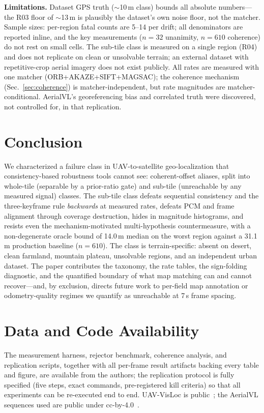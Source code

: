 \documentclass[journal]{IEEEtran}
\begin{document}
\textbf{Limitations.} Dataset GPS truth ($\sim$10\,m class) bounds all absolute numbers---the R03 floor of $\sim$13\,m is plausibly the dataset's own noise floor, not the matcher. Sample sizes: per-region fatal counts are 5--14 per drift; all denominators are reported inline, and the key measurements ($n=32$ unanimity, $n=610$ coherence) do not rest on small cells. The sub-tile class is measured on a single region (R04) and does not replicate on clean or unsolvable terrain; an external dataset with repetitive-crop aerial imagery does not exist publicly. All rates are measured with one matcher (ORB+AKAZE+SIFT+MAGSAC); the coherence mechanism (Sec.~\ref{sec:coherence}) is matcher-independent, but rate magnitudes are matcher-conditional. AerialVL's georeferencing bias and correlated truth were discovered, not controlled for, in that replication.

\section{Conclusion}

We characterized a failure class in UAV-to-satellite geo-localization that consistency-based robustness tools cannot see: coherent-offset aliases, split into whole-tile (separable by a prior-ratio gate) and sub-tile (unreachable by any measured signal) classes. The sub-tile class defeats sequential consistency and the three-keyframe rule \emph{backwards} at measured rates, defeats PCM and frame alignment through coverage destruction, hides in magnitude histograms, and resists even the mechanism-motivated multi-hypothesis countermeasure, with a non-degenerate oracle bound of 14.0\,m median on the worst region against a 31.1\,m production baseline ($n=610$). The class is terrain-specific: absent on desert, clean farmland, mountain plateau, unsolvable regions, and an independent urban dataset. The paper contributes the taxonomy, the rate tables, the sign-folding diagnostic, and the quantified boundary of what map matching can and cannot recover---and, by exclusion, directs future work to per-field map annotation or odometry-quality regimes we quantify as unreachable at 7\,s frame spacing.

\section*{Data and Code Availability}
The measurement harness, rejector benchmark, coherence analysis, and replication scripts, together with all per-frame result artifacts backing every table and figure, are available from the authors; the replication protocol is fully specified (five steps, exact commands, pre-registered kill criteria) so that all experiments can be re-executed end to end. UAV-VisLoc is public~\cite{uavvisloc}; the AerialVL sequences used are public under cc-by-4.0~\cite{aerialvl}.



\end{document}
